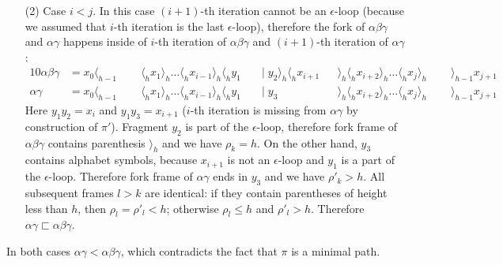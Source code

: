 \documentclass[AMA,STIX1COL]{WileyNJD-v2}
\newcommand{\Xl}{\langle}
\newcommand{\Xr}{\rangle}
\begin{document}
\begin{proofEnd}
\begin{enumerate}[itemsep=0.5em, topsep=0.5em]
    \item[(2)]
        Case $i < j$.
        In this case $(i + 1)$-th iteration cannot be an $\epsilon$-loop
        (because we assumed that $i$-th iteration is the last $\epsilon$-loop),
        therefore the fork of $\alpha \beta \gamma$ and $\alpha \gamma$ happens
        inside of $i$-th iteration of $\alpha \beta \gamma$
        and $(i + 1)$-th iteration of $\alpha \gamma$:
        \begin{alignat*}{10}
            \alpha \beta \gamma &= x_0 \Xl_{h-1} \;&&\; \Xl_h x_1 \Xr_h \hdots \Xl_h x_{i-1} \Xr_h \Xl_h y_1 \;&&\big|\; y_2 \Xr_h \Xl_h x_{i+1} && \Xr_h \Xl_h x_{i+2} \Xr_h \hdots \Xl_h x_j \Xr_h \;&&\; \Xr_{h-1} x_{j+1} \\[-0.5em]
            \alpha \gamma       &= x_0 \Xl_{h-1} \;&&\; \Xl_h x_1 \Xr_h \hdots \Xl_h x_{i-1} \Xr_h \Xl_h y_1 \;&&\big|\; y_3                     && \Xr_h \Xl_h x_{i+2} \Xr_h \hdots \Xl_h x_j \Xr_h \;&&\; \Xr_{h-1} x_{j+1}
        \end{alignat*}
        Here $y_1 y_2 = x_i$ and $y_1 y_3 = x_{i+1}$ ($i$-th iteration is missing from $\alpha \gamma$ by construction of $\pi'$).
        Fragment $y_2$ is part of the $\epsilon$-loop,
        therefore fork frame of $\alpha \beta \gamma$ contains parenthesis $\Xr_h$ and we have $\rho_k = h$.
        On the other hand, $y_3$ contains alphabet symbols,
        because $x_{i+1}$ is not an $\epsilon$-loop and $y_1$ is a part of the $\epsilon$-loop.
        Therefore fork frame of $\alpha \gamma$ ends in $y_3$ and we have $\rho'_k > h$.
        All subsequent frames $l > k$ are identical:
        if they contain parentheses of height less than $h$, then $\rho_l = \rho'_l < h$;
        otherwise $\rho_l \leq h$ and $\rho'_l > h$.
        Therefore $\alpha \gamma \sqsubset \alpha \beta \gamma$.
    \end{enumerate}
    In both cases $\alpha \gamma < \alpha \beta \gamma$,
    which contradicts the fact that $\pi$ is a minimal path.
\end{proofEnd}
\vspace{-0.5em}
\end{document}

